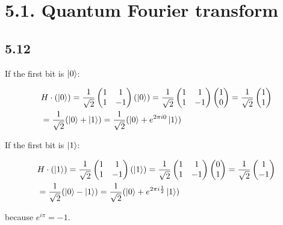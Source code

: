 \documentclass[12pt]{article}
\begin{document}
\section{5.1. Quantum Fourier transform}

\subsection{5.12}

If the first bit is $\ket{0}$:

\begin{equation*}
\begin{aligned}
&
H \cdot (\ket{0}) 
= 
\frac{1}{\sqrt{2}}
\begin{pmatrix}
1 & 1 \\ 
1 & -1 
\end{pmatrix}
(\ket{0})
= 
\frac{1}{\sqrt{2}}
\begin{pmatrix}
1 & 1 \\ 
1 & -1 
\end{pmatrix}
\begin{pmatrix}
1 \\ 
0 
\end{pmatrix}
=
\frac{1}{\sqrt{2}}
\begin{pmatrix}
1 \\ 
1 
\end{pmatrix} \\
&=
\frac{1}{\sqrt{2}}
(\ket{0} + \ket{1})
= 
\frac{1}{\sqrt{2}}
(\ket{0} + e^{2\pi i 0} \ket{1})
\end{aligned}
\end{equation*}


If the first bit is $\ket{1}$:

\begin{equation*}
\begin{aligned}
&
H \cdot (\ket{1}) 
= 
\frac{1}{\sqrt{2}}
\begin{pmatrix}
1 & 1 \\ 
1 & -1 
\end{pmatrix}
(\ket{1})
= 
\frac{1}{\sqrt{2}}
\begin{pmatrix}
1 & 1 \\ 
1 & -1 
\end{pmatrix}
\begin{pmatrix}
0 \\ 
1 
\end{pmatrix}
=
\frac{1}{\sqrt{2}}
\begin{pmatrix}
1 \\ 
-1 
\end{pmatrix} \\
&=
\frac{1}{\sqrt{2}}
(\ket{0} - \ket{1})
= 
\frac{1}{\sqrt{2}}
(\ket{0} + e^{2\pi i \frac{1}{2}} \ket{1})
\end{aligned}
\end{equation*}

because $e^{i\pi} = -1$.
\end{document}
